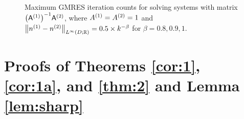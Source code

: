     \begin{figure}
      \centering

   \caption[Maximum GMRES iteration counts when $\NLiDRR{\nso-\nst} = 0.5\times  k^{-\beta}$ for $\beta = 0.8,0.9,1.$]{Maximum GMRES iteration counts for solving systems with matrix $\AmatoI\Amatt$, where ${A}^{(1)}={A}^{(2)}=1$ and $\NLiDRR{\nso-\nst} = 0.5\times  k^{-\beta}$ for $\beta = 0.8,0.9,1.$}\label{fig:linfinityn2}
\end{figure}
  



\section[Proofs of Theorems \MakeLowercase{\ref{cor:1}, \ref{cor:1a}, and \ref{thm:2}} and Lemma \MakeLowercase{\ref{lem:sharp}}]{Proofs of Theorems \ref{cor:1}, \ref{cor:1a}, and \ref{thm:2} and \newline Lemma \ref{lem:sharp}}\label{sec:3}









